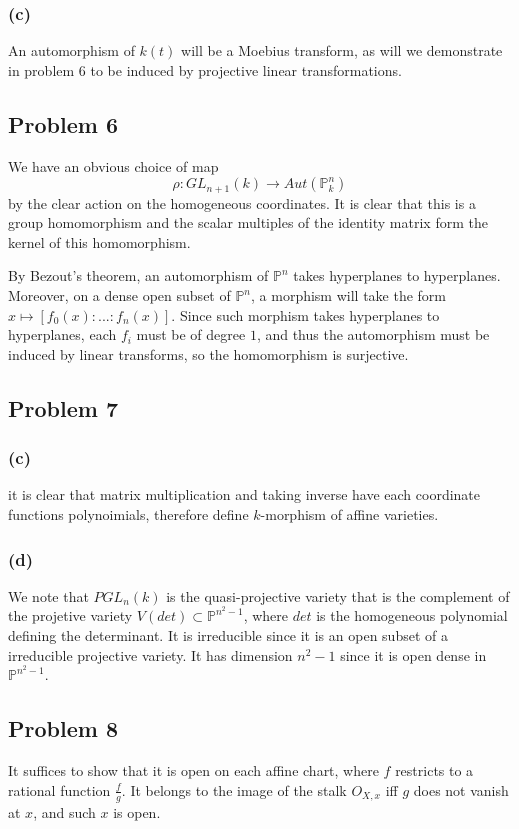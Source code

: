 \documentclass{article}
\theoremstyle{definition}
\theoremstyle{definition}
\theoremstyle{definition}
\theoremstyle{definition}
\theoremstyle{definition}
\theoremstyle{definition}
\theoremstyle{definition}
\begin{document}
\subsubsection*{(c)}
An automorphism of $k(t)$ will be a Moebius transform, as will we demonstrate in problem $6$ to be induced by projective linear transformations. 



\subsection*{Problem 6}
We have an obvious choice of map 
\[\rho: GL_{n+1}(k)\to Aut(\mathbb{P}_k^n) \]
by the clear action on the homogeneous coordinates. It is clear that this is a group homomorphism and the scalar multiples of the identity matrix form the kernel of this homomorphism.

By Bezout's theorem, an automorphism of $\mathbb{P}^n$ takes hyperplanes to hyperplanes. Moreover, on a dense open subset of $\mathbb{P}^n$, a morphism will take the form $x\mapsto [f_0(x):...:f_n(x)]$. Since such morphism takes hyperplanes to hyperplanes, each $f_i$ must be of degree $1$, and thus the automorphism must be induced by linear transforms, so the homomorphism is surjective.
\subsection*{Problem 7}
\subsubsection*{(c)}
it is clear that matrix multiplication and taking inverse have each coordinate functions polynoimials, therefore define $k$-morphism of affine varieties.
\subsubsection*{(d)}
We note that $PGL_n(k)$ is the quasi-projective variety that is the complement of the projetive variety $V(det)\subset \mathbb{P}^{n^2-1}$, where $det$ is the homogeneous polynomial defining the determinant. It is irreducible since it is an open subset of a irreducible projective variety. It has dimension $n^2-1$ since it is open dense in $\mathbb{P}^{n^2-1}$.

\subsection*{Problem 8}
It suffices to show that it is open on each affine chart, where $f$ restricts to a rational function $\frac{f}{g}$. It belongs to the image of the stalk $O_{X,x}$ iff $g$ does not vanish at $x$, and such $x$ is open. 
\end{document}
